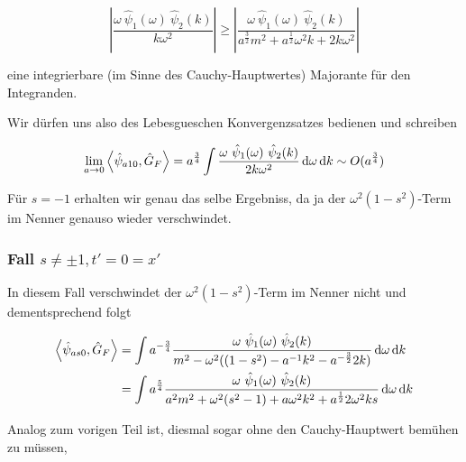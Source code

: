 \begin{equation*}
    \left|
        \frac{\omega ~\hat \psi_1(\omega) ~\hat \psi_2(k)}{k \omega^2}
    \right|
    \geq
    \left|
        \frac{\omega ~\hat \psi_1(\omega) ~\hat \psi_2(k)}
        {a^{\frac{3}{2}}m^2+a^{\frac{1}{2}}\omega^2 k+2k \omega^2}
    \right|
\end{equation*}

eine integrierbare (im Sinne des Cauchy-Hauptwertes) Majorante für den Integranden.


Wir dürfen uns also des Lebesgueschen Konvergenzsatzes bedienen und schreiben

\begin{equation}
    \lim_{a \rightarrow 0} \left< \hat\psi_{a10}, \hat G_F \right> =
    a^{\frac{3}{4}} \int \frac{
    \omega ~\hat \psi_1(\omega) ~\hat \psi_2(k)
    }
    {
    2k \omega^2
    }
    \mathop{}\!\mathrm{d} \omega \mathop{}\!\mathrm{d} k
    \sim O(a^{\frac{3}{4}})
\end{equation}

Für $s = -1$ erhalten wir genau das selbe Ergebniss, da ja der $\omega^2 (1-s^2)$-Term
im Nenner genauso wieder verschwindet.

\subsubsection*{Fall $s \neq \pm 1, t' = 0 = x'$}
In diesem Fall verschwindet der $\omega^2 (1-s^2)$-Term im Nenner nicht und
dementsprechend folgt

\begin{align*}
    \left< \hat\psi_{as0}, \hat G_F \right>
    &=
    \int a^{-\frac{3}{4}} \frac{
        \omega ~\hat \psi_1(\omega) ~\hat \psi_2(k)
    }
    {
        m^2-\omega^2 ((1-s^2) - a^{-1}k^2 - a^{-\frac{3}{2}}2 k )
    }
    \mathop{}\!\mathrm{d} \omega \mathop{}\!\mathrm{d} k \\
    &=
    \int a^{\frac{5}{4}} \frac{
        \omega ~\hat \psi_1(\omega) ~\hat \psi_2(k)
    }
    {
        a^2 m^2+\omega^2 (s^2-1) + a \omega^2 k^2 + a^{\frac{1}{2}}2 \omega^2 k s
    }
    \mathop{}\!\mathrm{d} \omega \mathop{}\!\mathrm{d} k
\end{align*}

Analog zum vorigen Teil ist, diesmal sogar ohne den Cauchy-Hauptwert bemühen zu
müssen,


